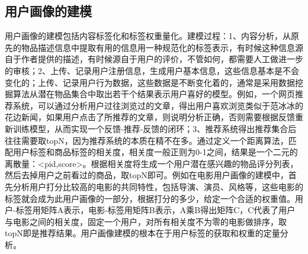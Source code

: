 		\begin{figure}
	    \centering
	      \label{pic:user_profile}
	    \end{figure}

		\subsection{用户画像的建模}
		用户画像的建模包括内容标签化和标签权重量化。建模过程：1、内容分析，从原先的物品描述信息中提取有用的信息用一种规范化的标签表示，有时候这种信息源自于作者提供的描述，有时候源自于用户的评价，不管如何，都需要人工做进一步的审核；2、上传、记录用户注册信息，生成用户基本信息，这些信息基本是不会变化的；上传、记录用户行为数据，这些数据是不断变化着的，通常是采用数据挖掘算法从潜在物品集合中取出若干个结果表示用户喜好的模型。例如，一个网页推荐系统，可以通过分析用户过往浏览过的文章，得出用户喜欢浏览类似于范冰冰的花边新闻，如果用户点击了所推荐的文章，则说明分析正确，否则需要根据反馈重新训练模型，从而实现一个反馈-推荐-反馈的闭环；3、推荐系统得出推荐集合后往往需要取topN，因为推荐系统的本质在精不在多。通过定义一个距离算法，匹配用户标签和商品标签的相关度，相关度一般正则为0-1之间，结果是一个二元的离散量：<pid,score>。根据相关度将生成一个用户潜在感兴趣的物品评分列表，然后去掉用户之前看过的商品，取topN即可。例如在电影用户画像的建模中，首先分析用户打分比较高的电影的共同特性，包括导演、演员、风格等，这些电影的标签就会成为此用户画像的一部分，根据打分的多少，给定一个合适的权重值。用户-标签用矩阵A表示，电影-标签用矩阵B表示，A乘B得出矩阵C，C代表了用户与电影之间的相关度，固定一个用户，对所有相关度不为零的电影做排序，取topN即是推荐结果。用户画像建模的根本在于用户标签的获取和权重的定量分析。

